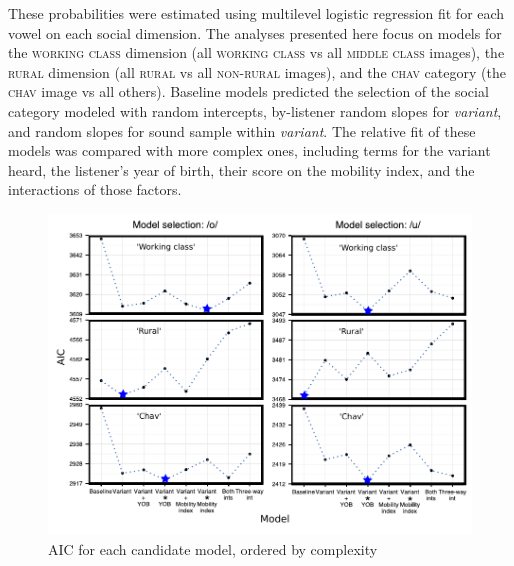 \documentclass[PWPL]{article}
\begin{document}
These probabilities were estimated using multilevel logistic regression fit for each vowel on each social dimension. The analyses presented here focus on models for the \textsc{working class} dimension (all \textsc{working class} vs all \textsc{middle class} images), the \textsc{rural} dimension (all \textsc{rural} vs all \textsc{non-rural} images), and the \textsc{chav} category (the \textsc{chav} image vs all others).  Baseline models predicted the selection of the social category modeled with random intercepts, by-listener random slopes for \textit{variant}, and random slopes for sound sample within \textit{variant}.
The relative fit of these models was compared with more complex ones, including terms for the variant heard, the listener's year of birth, their score on the mobility index, and the interactions of those factors.
\begin{figure}[ht]
\centering
\caption{AIC for each candidate model, ordered by complexity}
\includegraphics[scale=0.75]{model_comparison.pdf}
\end{figure}
\vspace{-.65cm}
\end{document}
